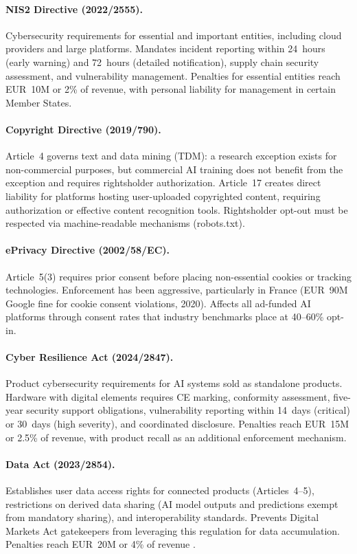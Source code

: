 \documentclass[11pt,a4paper]{article}
\begin{document}
\paragraph{NIS2 Directive (2022/2555).}
Cybersecurity requirements for essential and important entities, including cloud providers and large platforms. Mandates incident reporting within 24~hours (early warning) and 72~hours (detailed notification), supply chain security assessment, and vulnerability management. Penalties for essential entities reach EUR~10M or 2\% of revenue, with personal liability for management in certain Member States.

\paragraph{Copyright Directive (2019/790).}
Article~4 governs text and data mining (TDM): a research exception exists for non-commercial purposes, but commercial AI training does not benefit from the exception and requires rightsholder authorization. Article~17 creates direct liability for platforms hosting user-uploaded copyrighted content, requiring authorization or effective content recognition tools. Rightsholder opt-out must be respected via machine-readable mechanisms (robots.txt).

\paragraph{ePrivacy Directive (2002/58/EC).}
Article~5(3) requires prior consent before placing non-essential cookies or tracking technologies. Enforcement has been aggressive, particularly in France (EUR~90M Google fine for cookie consent violations, 2020). Affects all ad-funded AI platforms through consent rates that industry benchmarks place at 40--60\% opt-in.

\paragraph{Cyber Resilience Act (2024/2847).}
Product cybersecurity requirements for AI systems sold as standalone products. Hardware with digital elements requires CE marking, conformity assessment, five-year security support obligations, vulnerability reporting within 14~days (critical) or 30~days (high severity), and coordinated disclosure. Penalties reach EUR~15M or 2.5\% of revenue, with product recall as an additional enforcement mechanism.

\paragraph{Data Act (2023/2854).}
Establishes user data access rights for connected products (Articles~4--5), restrictions on derived data sharing (AI model outputs and predictions exempt from mandatory sharing), and interoperability standards. Prevents Digital Markets Act gatekeepers from leveraging this regulation for data accumulation. Penalties reach EUR~20M or 4\% of revenue \cite{dataact}.
\end{document}
